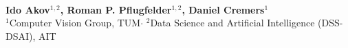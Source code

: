 {\fontsize{58}{70}\selectfont \PlakatTitel}\\[30pt]
{\fontsize{50}{60}\selectfont\textbf{Ido Akov$^{1,2}$, Roman P. Pflugfelder$^{1,2}$, Daniel Cremers$^{1}$}}\\[14pt]
{\fontsize{40}{48}\selectfont $^1$Computer Vision Group, TUM\quad$\cdot$\quad
$^2$Data Science and Artificial Intelligence (DSS-DSAI), AIT}\\[30pt]



\clearpage

